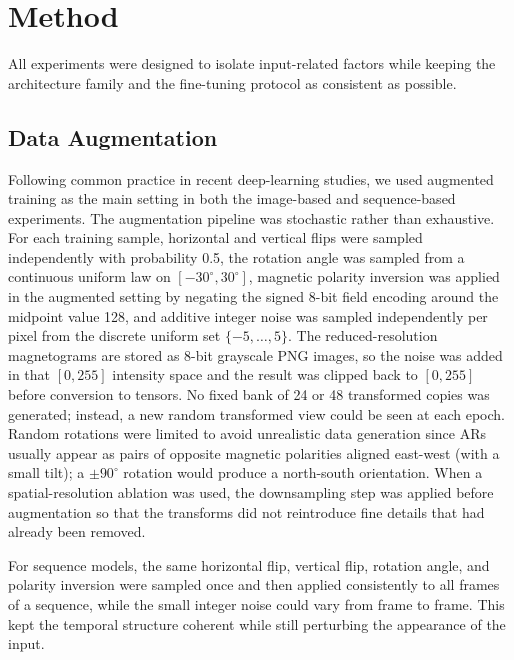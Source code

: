 \section{Method}

All experiments were designed to isolate input-related factors while keeping the architecture family and the fine-tuning protocol as consistent as possible.

\subsection{Data Augmentation}

Following common practice in recent deep-learning studies, we used augmented training as the main setting in both the image-based and sequence-based experiments. The augmentation pipeline was stochastic rather than exhaustive. For each training sample, horizontal and vertical flips were sampled independently with probability 0.5, the rotation angle was sampled from a continuous uniform law on $[-30^\circ, 30^\circ]$, magnetic polarity inversion was applied in the augmented setting by negating the signed 8-bit field encoding around the midpoint value 128, and additive integer noise was sampled independently per pixel from the discrete uniform set $\{-5,\ldots,5\}$. The reduced-resolution magnetograms are stored as 8-bit grayscale PNG images, so the noise was added in that $[0,255]$ intensity space and the result was clipped back to $[0,255]$ before conversion to tensors. No fixed bank of 24 or 48 transformed copies was generated; instead, a new random transformed view could be seen at each epoch. Random rotations were limited to avoid unrealistic data generation since ARs usually appear as pairs of opposite magnetic polarities aligned east-west (with a small tilt); a $\pm90^\circ$ rotation would produce a north-south orientation. When a spatial-resolution ablation was used, the downsampling step was applied before augmentation so that the transforms did not reintroduce fine details that had already been removed.

For sequence models, the same horizontal flip, vertical flip, rotation angle, and polarity inversion were sampled once and then applied consistently to all frames of a sequence, while the small integer noise could vary from frame to frame. This kept the temporal structure coherent while still perturbing the appearance of the input.

